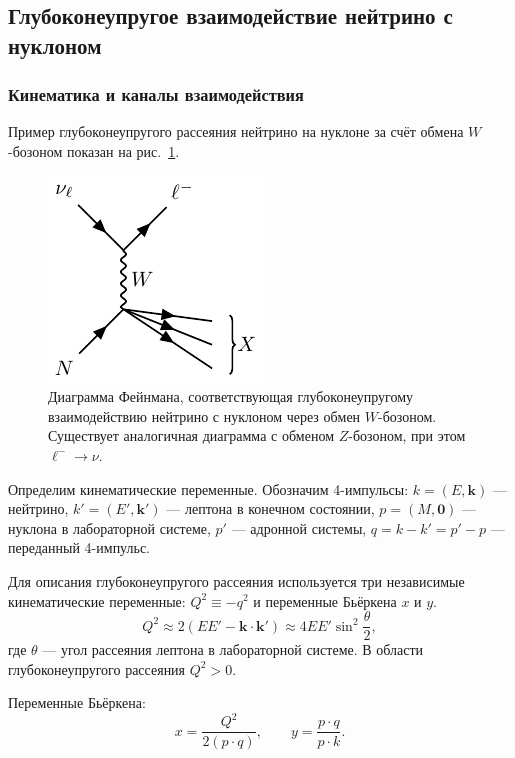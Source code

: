 \subsection{Глубоконеупругое взаимодействие нейтрино с нуклоном}

\subsubsection{Кинематика и каналы взаимодействия}

Пример глубоконеупругого рассеяния нейтрино на нуклоне за счёт обмена $W$-бозоном показан на рис.~\ref{fig:DIS}. 

\begin{figure}[!h]
\centering
\includegraphics[width=0.4\linewidth]{images/neutrino-nucleon-dis.pdf}
\caption{Диаграмма Фейнмана, соответствующая глубоконеупругому взаимодействию нейтрино с нуклоном через обмен $W$-бозоном. Существует аналогичная диаграмма с обменом $Z$-бозоном, при этом $\ell^- \to \nu$.}
\label{fig:DIS}
\end{figure}

Определим кинематические переменные. Обозначим 4-импульсы: 
$k = (E, \bm{k})$ — нейтрино, 
$k' = (E', \bm{k}')$ — лептона в конечном состоянии, 
$p = (M, \bm{0})$ — нуклона в лабораторной системе, 
$p'$ — адронной системы, 
$q = k - k' = p' - p$ — переданный 4-импульс.

Для описания глубоконеупругого рассеяния используется три независимые кинематические переменные: \( Q^2 \equiv -q^2\) и переменные Бьёркена \( x \) и \( y \).
\begin{equation}
  Q^2 \approx 2(EE' - \bm{k} \cdot \bm{k}') \approx 4EE' \sin^2\!\frac{\theta}{2},
\end{equation}
где \( \theta \) — угол рассеяния лептона в лабораторной системе. В области глубоконеупругого рассеяния \( Q^2 > 0 \).

Переменные Бьёркена:
\begin{equation}
  x = \frac{Q^2}{2(p \cdot q)}, 
  \qquad 
  y = \frac{p \cdot q}{p \cdot k}.
\end{equation}

